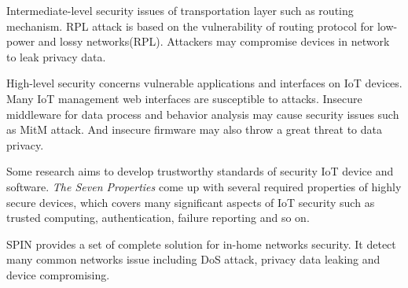 Intermediate-level security issues of transportation layer such as routing mechanism. RPL attack is based on the vulnerability of routing protocol for low-power and lossy networks(RPL)\cite{dvir2011vera}. Attackers may compromise devices in network to leak privacy data.

High-level security concerns vulnerable applications and interfaces on IoT devices. Many IoT management web interfaces are susceptible to attacks\cite{owasp2016url}. Insecure middleware for data process and behavior analysis may cause security issues such as MitM attack\cite{conzon2012virtus,levy2015ownership}. And insecure firmware may also throw a great threat to data privacy\cite{owasp2016url}.

Some research aims to develop trustworthy standards of security IoT device and software. \textit{The Seven Properties}\cite{hunt2017the} come up with several required properties of highly secure devices, which covers many significant aspects of IoT security such as trusted computing, authentication, failure reporting and so on.

SPIN\cite{hesselman2017spin} provides a set of complete solution for in-home networks security. It detect many common networks issue including DoS attack, privacy data leaking and device compromising.
